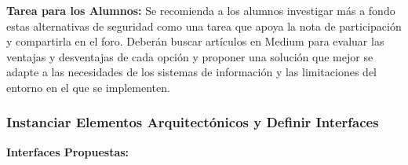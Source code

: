 \textbf{Tarea para los Alumnos:}
Se recomienda a los alumnos investigar más a fondo estas alternativas de seguridad como una tarea que apoya la nota de participación y compartirla en el foro. Deberán buscar artículos en Medium  para evaluar las ventajas y desventajas de cada opción y proponer una solución que mejor se adapte a las necesidades de los sistemas de información y las limitaciones del entorno en el que se implementen.







\subsubsection{Instanciar Elementos Arquitectónicos y Definir Interfaces}


\textbf{Interfaces Propuestas:}

